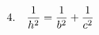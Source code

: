 \documentclass[preview]{standalone}
\begin{document}
\begin{align*}
\special{dvisvgm:raw <g id='unique000'>}4. \quad \frac{1}{h^2} = \frac{1}{b^2} + \frac{1}{c^2}\special{dvisvgm:raw </g>}
\end{align*}
\end{document}
